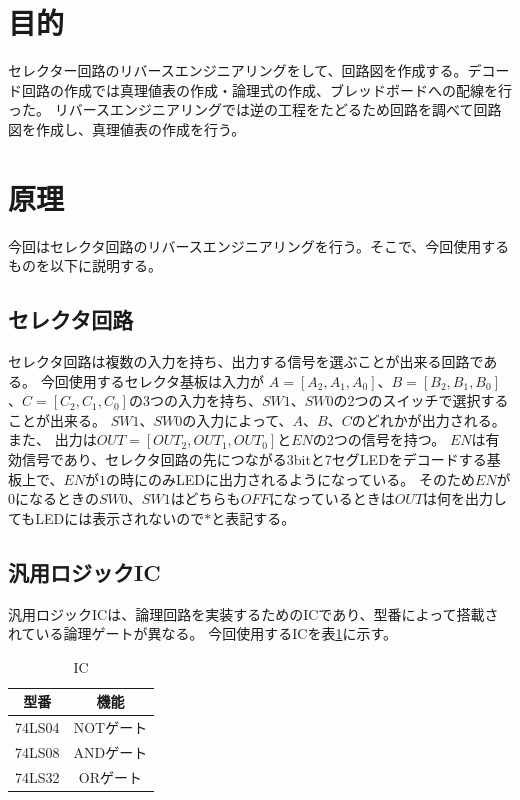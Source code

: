 \documentclass[a4paper,11pt]{ltjsarticle}
\begin{document}
\section{目的}
セレクター回路のリバースエンジニアリングをして、回路図を作成する。デコード回路の作成では真理値表の作成・論理式の作成、ブレッドボードへの配線を行った。
リバースエンジニアリングでは逆の工程をたどるため回路を調べて回路図を作成し、真理値表の作成を行う。
\section{原理}
今回はセレクタ回路のリバースエンジニアリングを行う。そこで、今回使用するものを以下に説明する。
\subsection{セレクタ回路}
セレクタ回路は複数の入力を持ち、出力する信号を選ぶことが出来る回路である。
今回使用するセレクタ基板は入力が $A = [A_2, A_1, A_0]$、$B = [B_2, B_1, B_0]$、$C = [C_2, C_1, C_0]$の3つの入力を持ち、$SW1$、$SW0$の2つのスイッチで選択することが出来る。
$SW1$、$SW0$の入力によって、$A$、$B$、$C$のどれかが出力される。また、
出力は$OUT = [OUT_2,OUT_1,OUT_0]$と$EN$の2つの信号を持つ。
$EN$は有効信号であり、セレクタ回路の先につながる3bitと7セグLEDをデコードする基板上で、$EN$が$1$の時にのみLEDに出力されるようになっている。
そのため$EN$が$0$になるときの$SW0$、$SW1$はどちらも$OFF$になっているときは$OUT$は何を出力してもLEDには表示されないので$*$と表記する。
\subsection{汎用ロジックIC}
汎用ロジックICは、論理回路を実装するためのICであり、型番によって搭載されている論理ゲートが異なる。
今回使用するICを表\ref{tab:IC}に示す。
\begin{table}[htbp]
  \centering
  \caption{IC}
  \begin{tabular}{|c|c|}
    \hline
    型番  &  機能  \\
    \hline
    74LS04 & NOTゲート \\
    74LS08 & ANDゲート \\
    74LS32 & ORゲート \\
    \hline
  \end{tabular}
  \label{tab:IC}
\end{table}
\end{document}
